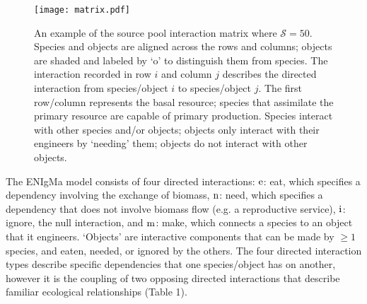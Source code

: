 \documentclass[twocolumn,preprintnumbers,amsmath,amssymb,superscriptaddress]{revtex4}
\newcommand{\rr}[1]{{\rm #1}}
\begin{document}
\begin{figure}
\centering
\texttt{[image: matrix.pdf]}
\caption{
An example of the source pool interaction matrix where $\mathcal{S} = 50$. Species and objects are aligned across the rows and columns; objects are shaded and labeled by `o' to distinguish them from species. The interaction recorded in row $i$ and column $j$ describes the directed interaction from species/object $i$ to species/object $j$. The first row/column represents the basal resource; species that assimilate the primary resource are capable of primary production. Species interact with other species and/or objects; objects only interact with their engineers by `needing' them; objects do not interact with other objects.
}
\label{fig:matrix}
\end{figure} 


The ENIgMa model consists of four directed interactions:
$\rr{e}$: eat, which specifies a dependency involving the exchange of biomass,
$\rr{n}$: need, which specifies a dependency that does not involve biomass flow (e.g. a reproductive service),
$\rr{i}$: ignore, the null interaction, and
$\rr{m}$: make, which connects a species to an object that it engineers. 
`Objects' are interactive components that can be made by $\geq 1$ species, and eaten, needed, or ignored by the others.
The four directed interaction types describe specific dependencies that one species/object has on another, however it is the coupling of two opposing directed interactions that describe familiar ecological relationships (Table 1).
\end{document}
